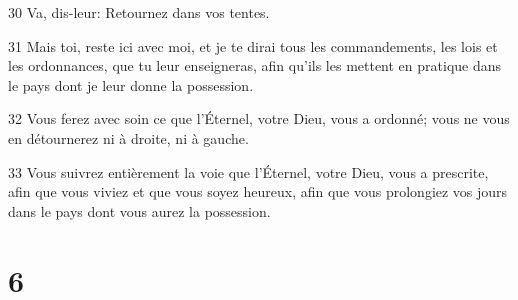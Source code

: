 \par 30 Va, dis-leur: Retournez dans vos tentes.
\par 31 Mais toi, reste ici avec moi, et je te dirai tous les commandements, les lois et les ordonnances, que tu leur enseigneras, afin qu'ils les mettent en pratique dans le pays dont je leur donne la possession.
\par 32 Vous ferez avec soin ce que l'Éternel, votre Dieu, vous a ordonné; vous ne vous en détournerez ni à droite, ni à gauche.
\par 33 Vous suivrez entièrement la voie que l'Éternel, votre Dieu, vous a prescrite, afin que vous viviez et que vous soyez heureux, afin que vous prolongiez vos jours dans le pays dont vous aurez la possession.

\chapter{6}


